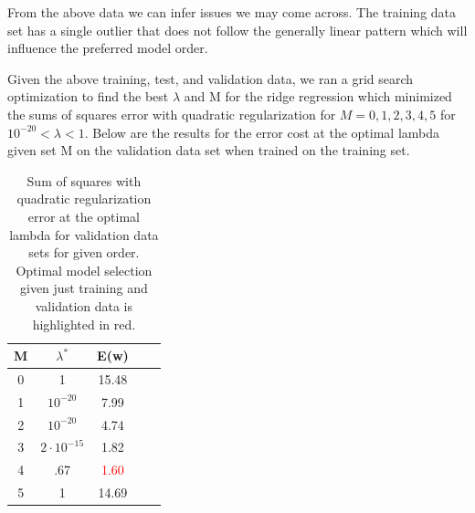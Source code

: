 \documentclass[10pt,twocolumn]{article}
\begin{document}
From the above data we can infer issues we may come across. The training data set has a single outlier that does not follow the generally linear pattern which will influence the preferred model order. 

Given the above training, test, and validation data, we ran a grid search optimization to find the best $\lambda$ and M for the ridge regression which minimized the sums of squares error with quadratic regularization for $M= {0,1,2,3,4,5}$  for $10^{-20} < \lambda <1 $. Below are the results for the error cost at the optimal lambda given set M on the validation data set when trained on the training set. 

\begin{table}
\begin{center}
  \begin{tabular}{ | c | c | c | c | c | }
    \hline
     M & $\lambda ^*$  & E(w) \\ \hline
     0 & 1 & 15.48  \\ \hline
     1 & $10^{-20}$ & 7.99   \\ \hline
     2 & $10^{-20}$ & 4.74   \\ \hline
     3 & $2 \cdot 10^{-15}$ & 1.82   \\ \hline
     4 & .67 & \textcolor{red}{1.60}   \\ \hline
     5 & 1 & 14.69  \\ \hline    
    \hline
  \end{tabular}
  \caption{Sum of squares with quadratic regularization error at the optimal lambda for validation data sets for given order. Optimal model selection given just training and validation data is highlighted in red. }
\end{center}
\label{table:ave_sse}
\end{table}
\end{document}
